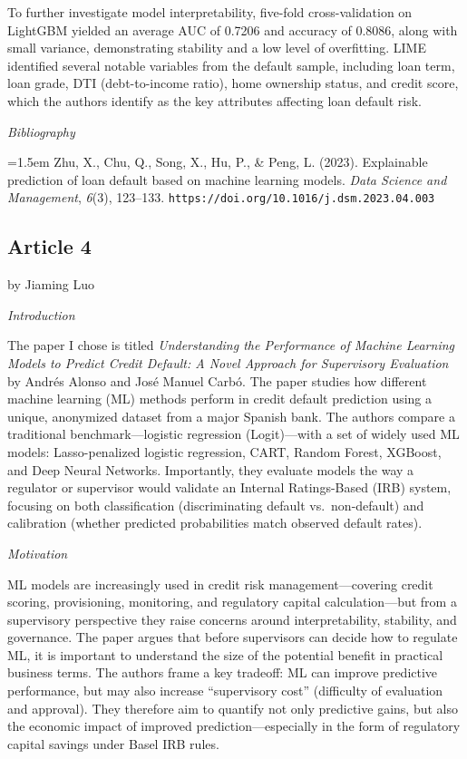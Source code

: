 \documentclass[letterpaper]{article}
\begin{document}
	To further investigate model interpretability, five-fold cross-validation on LightGBM yielded an average AUC of 0.7206 and accuracy of 0.8086, along with small variance, demonstrating stability and a low level of overfitting. LIME identified several notable variables from the default sample, including loan term, loan grade, DTI (debt-to-income ratio), home ownership status, and credit score, which the authors identify as the key attributes affecting loan default risk.
	
	\medskip
	
	\textit{Bibliography}
	
	\hangindent=1.5em
	Zhu, X., Chu, Q., Song, X., Hu, P., \& Peng, L. (2023). Explainable prediction of loan default based on machine learning models. \textit{Data Science and Management}, \textit{6}(3), 123--133. \texttt{https://doi.org/10.1016/j.dsm.2023.04.003}
	
	
	\subsection{Article 4}
	
	{\color{deepred} by Jiaming Luo}
	
	
	\textit{Introduction}
	
	The paper I chose is titled \textit{Understanding the Performance of Machine Learning Models to Predict Credit Default: A Novel Approach for Supervisory Evaluation} by Andr\'{e}s Alonso and Jos\'{e} Manuel Carb\'{o}. The paper studies how different machine learning (ML) methods perform in credit default prediction using a unique, anonymized dataset from a major Spanish bank. The authors compare a traditional benchmark---logistic regression (Logit)---with a set of widely used ML models: Lasso-penalized logistic regression, CART, Random Forest, XGBoost, and Deep Neural Networks. Importantly, they evaluate models the way a regulator or supervisor would validate an Internal Ratings-Based (IRB) system, focusing on both classification (discriminating default vs.\ non-default) and calibration (whether predicted probabilities match observed default rates).
	
	\medskip
	
	\textit{Motivation}
	
	ML models are increasingly used in credit risk management---covering credit scoring, provisioning, monitoring, and regulatory capital calculation---but from a supervisory perspective they raise concerns around interpretability, stability, and governance. The paper argues that before supervisors can decide how to regulate ML, it is important to understand the size of the potential benefit in practical business terms. The authors frame a key tradeoff: ML can improve predictive performance, but may also increase ``supervisory cost'' (difficulty of evaluation and approval). They therefore aim to quantify not only predictive gains, but also the economic impact of improved prediction---especially in the form of regulatory capital savings under Basel IRB rules.
	
\end{document}
